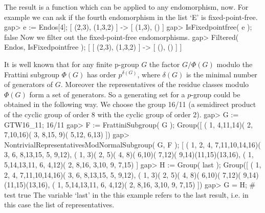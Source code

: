         The result is a function which can be applied to any endomorphism, now.
        For example we can ask if the fourth endomorphism in the list `E' is
        fixed-point-free.
\beginexample
    gap> e := Endos[4];
    [ (2,3), (1,3,2) ] -> [ (1,3), () ]
    gap> IsFixedpointfree( e );
    false
\endexample
        Now we filter out the fixed-point-free endomorphisms.
\beginexample
    gap> Filtered( Endos, IsFixedpointfree );
    [ [ (2,3), (1,3,2) ] -> [ (), () ] ]
\endexample



        It is well known that for any finite p-group $G$ the factor $G/\Phi(G)$
        modulo the Frattini subgroup $\Phi(G)$ has order $p^{\delta(G)}$, where
        $\delta(G)$ is the minimal number of generators of $G$. Moreover
        the representatives of the residue classes modulo $\Phi(G)$ form a
        set of generators. So a generating set for a $p$-group
        could  be obtained in the following way. We choose the group 16/11 (a
        semidirect product of the cyclic group of order 8 with the cyclic
        group of order 2).
\beginexample
    gap> G := GTW16_11;                                     
    16/11
    gap> F := FrattiniSubgroup( G );
    Group([ ( 1, 4,11,14)( 2, 7,10,16)( 3, 8,15, 9)( 5,12, 6,13) ])
    gap> NontrivialRepresentativesModNormalSubgroup( G, F );
    [ ( 1, 2, 4, 7,11,10,14,16)( 3, 6, 8,13,15, 5, 9,12), 
      ( 1, 3)( 2, 5)( 4, 8)( 6,10)( 7,12)( 9,14)(11,15)(13,16), 
      ( 1, 5,14,13,11, 6, 4,12)( 2, 8,16, 3,10, 9, 7,15) ]
    gap> H := Group( last );
    Group([ ( 1, 2, 4, 7,11,10,14,16)( 3, 6, 8,13,15, 5, 9,12), 
      ( 1, 3)( 2, 5)( 4, 8)( 6,10)( 7,12)( 9,14)(11,15)(13,16), 
      ( 1, 5,14,13,11, 6, 4,12)( 2, 8,16, 3,10, 9, 7,15) ])
    gap> G = H;  # test
    true
\endexample
        The variable `last' in the this example refers to the last result,
        i.e. in this case the list of representatives.

